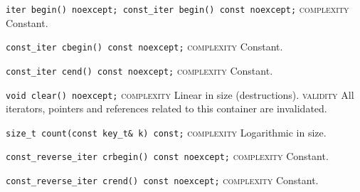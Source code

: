 \noindent{}\hspace*{0.25em}\lstinline[basicstyle=\ttfamily\color{cgreen}]{iter begin() noexcept; const_iter begin() const noexcept;} \textsc{complexity} Constant.\\\vspace{-0.6em}

\noindent{}\hspace*{0.25em}\lstinline[basicstyle=\ttfamily\color{cgreen}]{const_iter cbegin() const noexcept;} \textsc{complexity} Constant.\\\vspace{-0.6em}

\noindent{}\hspace*{0.25em}\lstinline[basicstyle=\ttfamily\color{cgreen}]{const_iter cend() const noexcept;} \textsc{complexity} Constant.\\\vspace{-0.6em}

\noindent{}\hspace*{0.25em}\lstinline[basicstyle=\ttfamily\color{corange}]{void clear() noexcept;} \textsc{complexity} Linear in size (destructions). \textsc{validity} All iterators, pointers and references related to this container are invalidated.\\\vspace{-0.6em}

\noindent{}\hspace*{0.25em}\lstinline[basicstyle=\ttfamily\color{clime}]{size_t count(const key_t& k) const;} \textsc{complexity} Logarithmic in size.\\\vspace{-0.6em}

\noindent{}\hspace*{0.25em}\lstinline[basicstyle=\ttfamily\color{cgreen}]{const_reverse_iter crbegin() const noexcept;} \textsc{complexity} Constant.\\\vspace{-0.6em}

\noindent{}\hspace*{0.25em}\lstinline[basicstyle=\ttfamily\color{cgreen}]{const_reverse_iter crend() const noexcept;} \textsc{complexity} Constant.\\\vspace{-0.6em}

